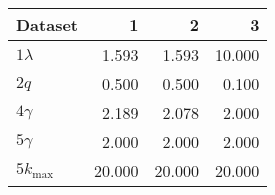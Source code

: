 \begin{tabular}{lrrr}
\toprule
 Dataset      &      1 &      2 &      3 \\
\midrule
 $1 \lambda$  &  \num{1.593} &  \num{1.593} & \num{10.000} \\
 $2 q$        &  \num{0.500} &  \num{0.500} &  \num{0.100} \\
 $4 \gamma$   &  \num{2.189} &  \num{2.078} &  \num{2.000} \\
 $5 \gamma$   &  \num{2.000} &  \num{2.000} &  \num{2.000} \\
 $5 k_{\max}$ & \num{20.000} & \num{20.000} & \num{20.000} \\
\bottomrule
\end{tabular}
